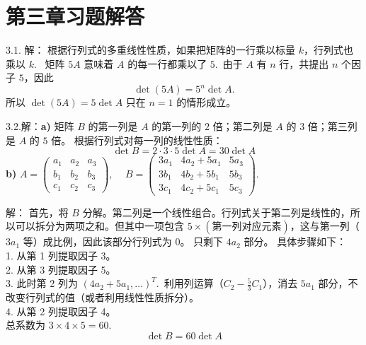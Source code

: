 \section*{第三章习题解答}

\begin{exer}


3.1. 解：
根据行列式的多重线性性质，如果把矩阵的一行乘以标量 $k$，行列式也乘以 $k$.~
矩阵 $5A$ 意味着 $A$ 的每一行都乘以了 $5$.~由于 $A$ 有 $n$ 行，共提出 $n$ 个因子 $5$，因此
$$ \det(5A) = 5^n \det A. $$
所以 $\det(5A)=5\det A$ 只在 $n=1$ 的情形成立。

3.2.解：\textbf{a)}
矩阵 $B$ 的第一列是 $A$ 的第一列的 $2$ 倍；第二列是 $A$ 的 $3$ 倍；第三列是 $A$ 的 $5$ 倍。
根据行列式对每一列的线性性质：
$$ \det B = 2 \cdot 3 \cdot 5 \det A = 30 \det A $$
\textbf{b)} $A = \begin{pmatrix} a_1 & a_2 & a_3 \\ b_1 & b_2 & b_3 \\ c_1 & c_2 & c_3 \end{pmatrix}$, $\quad B = \begin{pmatrix} 3a_1 & 4a_2 + 5a_1 & 5a_3 \\ 3b_1 & 4b_2 + 5b_1 & 5b_3 \\ 3c_1 & 4c_2 + 5c_1 & 5c_3 \end{pmatrix}$.

解：
首先，将 $B$ 分解。第二列是一个线性组合。行列式关于第二列是线性的，所以可以拆分为两项之和。但其中一项包含 $5 \times (\text{第一列对应元素})$，这与第一列（$3a_1$ 等）成比例，因此该部分行列式为 0。
只剩下 $4a_2$ 部分。
具体步骤如下：\\
1. 从第 1 列提取因子 3。\\
2. 从第 3 列提取因子 5。\\
3. 此时第 2 列为 $(4a_2+5a_1, \dots)^T$.~利用列运算（$C_2 - \frac{5}{3}C_1$），消去 $5a_1$ 部分，不改变行列式的值（或者利用线性性质拆分）。\\
4. 从第 2 列提取因子 4。\\
总系数为 $3 \times 4 \times 5 = 60$.~
$$ \det B = 60 \det A $$


\end{exer}
